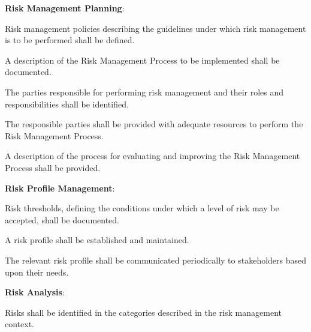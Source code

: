 			\begin{adjustwidth}{2em}{0pt} 

				\begin{compactenum}

					\item {\bf Risk Management Planning}:

					\begin{compactenum}
						\item Risk management policies describing the guidelines under which risk management is to be performed shall be defined.

						\item A description of the Risk Management Process to be implemented shall be documented.

						\item The parties responsible for performing risk management and their roles and responsibilities shall be identified.

						\item The responsible parties shall be provided with adequate resources to perform the Risk Management Process.

						\item A description of the process for evaluating and improving the Risk Management Process shall be provided.
					\end{compactenum}

					\item {\bf Risk Profile Management}:

					\begin{compactenum}
						\item Risk thresholds, defining the conditions under which a level of risk may be accepted, shall be documented.

						\item A risk profile shall be established and maintained.

						\item The relevant risk profile shall be communicated periodically to stakeholders based upon their needs.
					\end{compactenum}

					\item {\bf Risk Analysis}:

					\begin{compactenum}
						\item Risks shall be identified in the categories described in the risk management context.


\end{compactenum}
\end{compactenum}
\end{adjustwidth}
